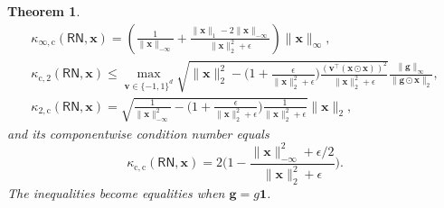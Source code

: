 \documentclass[namedate,webpdf,imanum]{ima-authoring-template}
\newcommand{\Matrix}[1]{\mathbf{#1}}
\newcommand{\trans}{\intercal}
\newcommand{\Norm}[3][]{#1\| #2 #1\|_{\mathrm{#3}}}
\newcommand{\hap}{\mathbin{\odot}}
\newcommand{\One}{\Matrix{1}}
\newcommand{\Layer}[1]{\mathsf{#1}}
\newcommand{\cond}[3][]{\kappa_{\mathrm{#2}} #1( #3 #1)}
\newtheorem{theorem}{Theorem}[section]%
\numberwithin{equation}{section}
\begin{document}
\begin{theorem}
\begin{gather*}
    \cond{\infty,c}{\Layer{RN}, \Matrix{x}} = \left( \frac{1}{\Norm{\Matrix{x}}{-\infty}} + \frac{ \Norm{\Matrix{x}}{1} - 2 \Norm{\Matrix{x}}{-\infty} }{\Norm{\Matrix{x}}{2}^2 + \epsilon} \right) \Norm{\Matrix{x}}{\infty}, \\
    \cond{c,2}{\Layer{RN}, \Matrix{x}} \leq \max_{\Matrix{v} \in \{ -1,1 \}^d} \sqrt{\Norm{\Matrix{x}}{2}^2 - \bigg( 1 + \frac{\epsilon}{\Norm{\Matrix{x}}{2}^2 + \epsilon} \bigg) \frac{(\Matrix{v}^\trans (\Matrix{x} \hap \Matrix{x}))^2}{\Norm{\Matrix{x}}{2}^2 + \epsilon}} \frac{\Norm{\Matrix{g}}{\infty}}{\Norm{\Matrix{g} \hap \Matrix{x}}{2}}, \\
    \cond{2,c}{\Layer{RN}, \Matrix{x}} = \sqrt{\frac{1}{\Norm{\Matrix{x}}{-\infty}^2} - \bigg( 1 + \frac{\epsilon}{\Norm{\Matrix{x}}{2}^2 + \epsilon} \bigg) \frac{1}{\Norm{\Matrix{x}}{2}^2 + \epsilon}} \Norm{\Matrix{x}}{2},
\end{gather*}
and its componentwise condition number equals
\begin{equation*}
    \cond{c,c}{\Layer{RN}, \Matrix{x}} = 2 \bigg( 1 - \frac{\Norm{\Matrix{x}}{-\infty}^2 + \epsilon/2}{\Norm{\Matrix{x}}{2}^2 + \epsilon} \bigg).
\end{equation*}
The inequalities become equalities when $\Matrix{g} = g \One$.
\end{theorem}
\end{document}
